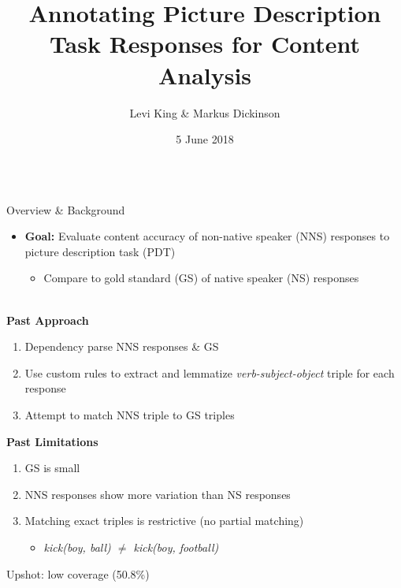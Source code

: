\documentclass[final,t]{beamer}
\title[]{Annotating Picture Description Task Responses for Content Analysis}
\author[]{Levi King \& Markus Dickinson}
\institute[]{Indiana University}
\date[]{5 June 2018}
\begin{document}
\begin{frame}{}
\vspace{-1.3em}
  \begin{columns}[t]
    \begin{column}{.33\linewidth}

\begin{block}{Overview \& Background}
  \begin{itemize}
    \itemsep1em
  \item{\textbf{Goal:} Evaluate content accuracy of non-native speaker (NNS) responses to picture description task (PDT) 
      \begin{itemize}
      \item Compare to gold standard (GS) of native speaker (NS) responses
      \end{itemize}
    }
\end{itemize}
    \begin{center}
      \mbox{}\\[-1em]\textbf{Past Approach}
    \end{center}
      \begin{center}\begin{minipage}{.8\textwidth}
      \begin{enumerate}
      \item Dependency parse NNS responses \& GS
      \item Use custom rules to extract and lemmatize
        \textit{verb-subject-object} triple for each response
      \item Attempt to match NNS triple to GS triples
      \end{enumerate}
      \end{minipage}\end{center}

    \begin{center}
      \textbf{Past Limitations} 
    \end{center}
      \begin{center}\begin{minipage}{.8\textwidth}
      \begin{enumerate}
      \item GS is small
      \item NNS responses show more variation than NS responses
      \item Matching exact triples is restrictive (no partial matching)
        \begin{itemize}
        \item{\textit{kick(boy, ball) $\neq$ kick(boy, football)}}
        \end{itemize}
      \end{enumerate}
      \begin{center}
        Upshot: low coverage (50.8\%)
      \end{center}
      \end{minipage}\end{center}


\end{block}
\end{column}
\end{columns}
\end{frame}
\end{document}
